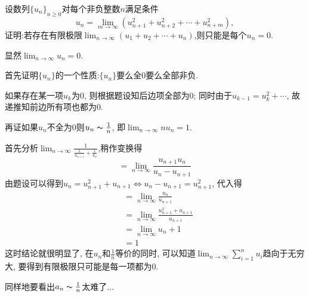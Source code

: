      \begin{exercise}
         设数列$\{u_n\}_{n \geqslant 0}$对每个非负整数$n$满足条件
         \[
             u_n=\lim_{m\to\infty}(u_{n+1}^2+u_{n+2}^2+\cdots+u_{n+m}^2),
         \]
         证明:若存在有限极限$\lim_{n\to\infty}(u_1+u_2+\cdots+u_n)$,则只能是每个$u_n=0$.
     \end{exercise}
     \begin{solution}
         显然$\lim_{n\to\infty}u_n=0$.

         首先证明$\{u_n\}$的一个性质:$\{u_n\}$要么全0要么全部非负.

         如果存在某一项$u_k$为0, 则根据题设知后边项全部为0; 同时由于$u_{k-1}=u_k^2+\cdots$, 故递推知前边所有项也都为0.

         再证如果$u_n$不全为0则$u_n\thicksim\frac{1}{n}$, 即$\lim_{n\to\infty}nu_n=1$.

         首先分析$\lim_{n\to\infty}\frac{1}{\frac{1}{u_{n+1}}+\frac{1}{u_n}}$,稍作变换得
         \[
             =\lim_{n\to\infty}\frac{u_{n+1}u_n}{u_n-u_{n+1}}
         \]
         由题设可以得到$u_n=u_{n+1}^2+u_{n+1}\Longleftrightarrow u_n-u_{n+1}=u_{n+1}^2$, 代入得
         \begin{align*}
              & =\lim_{n\to\infty}\frac{u_n}{u_{n+1}}               \\
              & =\lim_{n\to\infty}\frac{u_{n+1}^2+u_{n+1}}{u_{n+1}} \\
              & =\lim_{n\to\infty}u_n+1                             \\
              & =1
         \end{align*}
         这时结论就很明显了, 在$u_n$和$\frac{1}{n}$等价的同时, 可以知道$\lim_{n\to\infty}\sum_{i=1}^{n}u_i$趋向于无穷大, 要得到有限极限只可能是每一项都为0.
     \end{solution}
     \begin{note}
         同样地要看出$a_n\thicksim \frac{1}{n}$太难了...
     \end{note}

